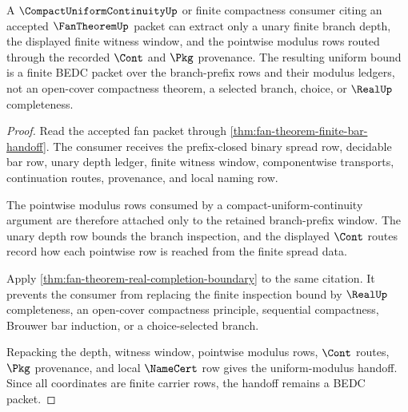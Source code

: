 \begin{theorem}
\label{thm:fan-theorem-bar-uniform-modulus}
A $\CompactUniformContinuityUp$ or finite compactness consumer citing an accepted $\FanTheoremUp$ packet can extract only a unary finite branch depth, the displayed finite witness window, and the pointwise modulus rows routed through the recorded $\Cont$ and $\Pkg$ provenance. The resulting uniform bound is a finite BEDC packet over the branch-prefix rows and their modulus ledgers, not an open-cover compactness theorem, a selected branch, choice, or $\RealUp$ completeness.
\end{theorem}
\begin{proof}
Read the accepted fan packet through \autoref{thm:fan-theorem-finite-bar-handoff}. The consumer receives the prefix-closed binary spread row, decidable bar row, unary depth ledger, finite witness window, componentwise transports, continuation routes, provenance, and local naming row.

The pointwise modulus rows consumed by a compact-uniform-continuity argument are therefore attached only to the retained branch-prefix window. The unary depth row bounds the branch inspection, and the displayed $\Cont$ routes record how each pointwise row is reached from the finite spread data.

Apply \autoref{thm:fan-theorem-real-completion-boundary} to the same citation. It prevents the consumer from replacing the finite inspection bound by $\RealUp$ completeness, an open-cover compactness principle, sequential compactness, Brouwer bar induction, or a choice-selected branch.

Repacking the depth, witness window, pointwise modulus rows, $\Cont$ routes, $\Pkg$ provenance, and local $\NameCert$ row gives the uniform-modulus handoff. Since all coordinates are finite carrier rows, the handoff remains a BEDC packet.
\end{proof}

